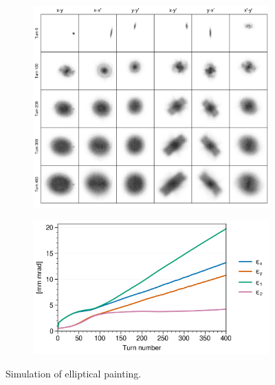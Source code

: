 \begin{figure}[!p]
    \centering
    \begin{subfigure}{\textwidth}
        \includegraphics[width=\textwidth]{Images/chapter3/snapshots.png}
    \end{subfigure}
    \vfill
    \vspace*{1.0cm}
    \vfill
    \begin{subfigure}{0.7\textwidth}
        \includegraphics[width=\textwidth]{Images/chapter3/emittances.png}
    \end{subfigure}
    \caption{Simulation of elliptical painting.}
    \label{fig:my_label}
\end{figure}